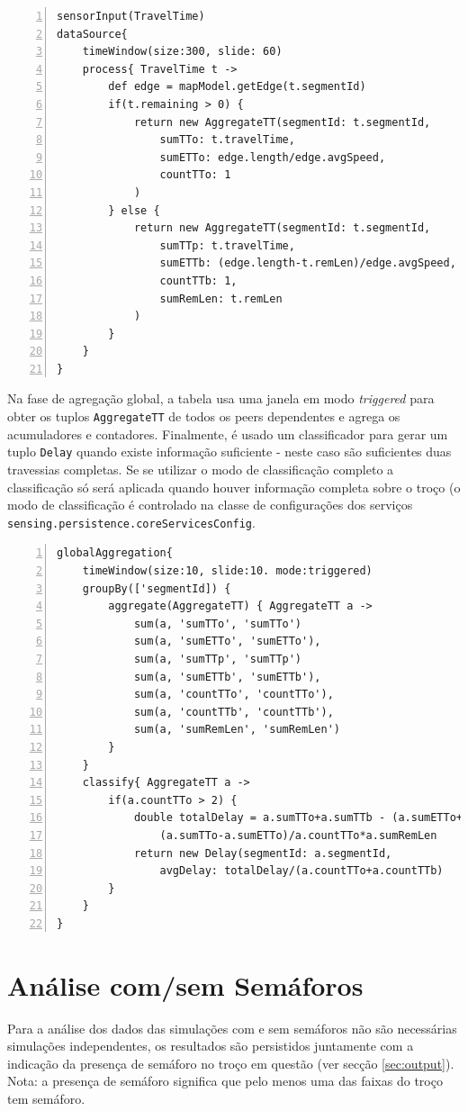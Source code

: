 \documentclass{article}
\newcommand{\tm}[1]{\texttt{#1}}
\begin{document}
\begin{Verbatim}[numbers=left]
sensorInput(TravelTime)
dataSource{
	timeWindow(size:300, slide: 60)
	process{ TravelTime t ->
		def edge = mapModel.getEdge(t.segmentId)
		if(t.remaining > 0) {
			return new AggregateTT(segmentId: t.segmentId, 
				sumTTo: t.travelTime,
				sumETTo: edge.length/edge.avgSpeed,
				countTTo: 1
			)
		} else {
			return new AggregateTT(segmentId: t.segmentId, 
				sumTTp: t.travelTime,
				sumETTb: (edge.length-t.remLen)/edge.avgSpeed,
				countTTb: 1,
				sumRemLen: t.remLen
			)
		}
	}
}
\end{Verbatim}

Na fase de agregação global, a tabela usa uma janela em modo \emph{triggered} para obter os tuplos \tm{AggregateTT} de todos os peers dependentes e agrega os acumuladores e contadores.
Finalmente, é usado um classificador para gerar um tuplo \tm{Delay} quando existe informação suficiente - neste caso são suficientes duas travessias completas. Se se utilizar o modo de classificação completo a classificação só será aplicada quando houver informação completa sobre o troço (o modo de classificação é controlado na classe de configurações dos serviços \tm{sensing.persistence.coreServicesConfig}.


\begin{Verbatim}[numbers=left]
globalAggregation{
	timeWindow(size:10, slide:10. mode:triggered)
	groupBy(['segmentId]) {
		aggregate(AggregateTT) { AggregateTT a ->
			sum(a, 'sumTTo', 'sumTTo')
			sum(a, 'sumETTo', 'sumETTo'),
			sum(a, 'sumTTp', 'sumTTp')
			sum(a, 'sumETTb', 'sumETTb'),
			sum(a, 'countTTo', 'countTTo'),
			sum(a, 'countTTb', 'countTTb'),
			sum(a, 'sumRemLen', 'sumRemLen')
		}
	}
	classify{ AggregateTT a ->
		if(a.countTTo > 2) {
			double totalDelay = a.sumTTo+a.sumTTb - (a.sumETTo+a,sumETTb) + 
				(a.sumTTo-a.sumETTo)/a.countTTo*a.sumRemLen
			return new Delay(segmentId: a.segmentId, 
				avgDelay: totalDelay/(a.countTTo+a.countTTb)
		}
	}
}
\end{Verbatim}

\section{Análise com/sem Semáforos}

Para a análise dos dados das simulações com e sem semáforos não são necessárias simulações independentes, os resultados são persistidos juntamente com a indicação da presença de semáforo no troço em questão (ver secção \ref{sec:output}). Nota: a presença de semáforo significa que pelo menos uma das faixas do troço tem semáforo.
\end{document}
